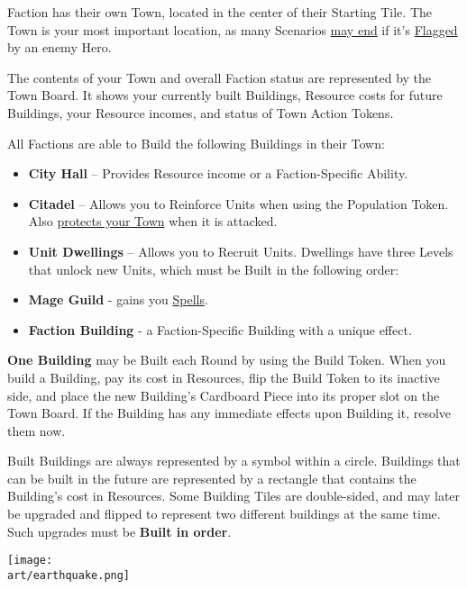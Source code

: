 
\begin{multicols*}{2}

 Faction has their own Town, located in the center of their Starting Tile.
The Town is your most important location, as many Scenarios \hyperlink{End}{may end} if it's \hyperlink{Categories}{Flagged} by an enemy Hero.\par
The contents of your Town and overall Faction status are represented by the Town Board.
It shows your currently built Buildings, Resource costs for future Buildings, your Resource incomes, and status of Town Action Tokens.\par
All Factions are able to Build the following Buildings in their Town:
\begin{itemize}
  \item \textbf{City Hall} – Provides Resource income or a Faction-Specific Ability.
  \item \textbf{Citadel} – Allows you to Reinforce Units when using the Population Token.
Also \hyperlink{Walls}{protects your Town} when it is attacked.
  \item \textbf{Unit Dwellings} – Allows you to Recruit Units.
Dwellings have three Levels that unlock new Units, which must be Built in the following order:
  \item \textbf{Mage Guild} - gains you \hyperlink{spells}{Spells}.
  \item \textbf{Faction Building} - a Faction-Specific Building with a unique effect.
\end{itemize}
\textbf{One Building} may be Built each Round by using the Build Token.
When you build a Building, pay its cost in Resources, flip the Build Token to its inactive side, and place the new Building’s Cardboard Piece into its proper slot on the Town Board.
If the Building has any immediate effects upon Building it, resolve them now.\par
Built Buildings are always represented by a symbol within a circle.
Buildings that can be built in the future are represented by a rectangle that contains the Building's cost in Resources.
Some Building Tiles are double-sided, and may later be upgraded and flipped to represent two different buildings at the same time. Such upgrades must be \textbf{Built in order}.\par

\vspace*{\fill}

\begin{center}
  \texttt{[image: \\art/earthquake.png]}
\end{center}

\vspace*{\fill}

\end{multicols*}
